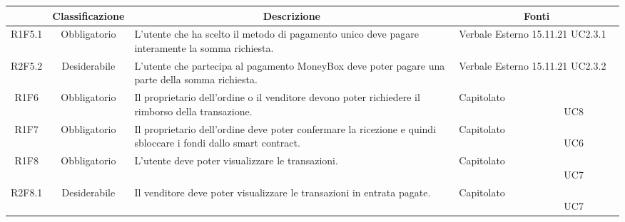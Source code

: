 \begin{table}[H]
    \centering
    \renewcommand{\arraystretch}{1.8}
    \begin{tabular}{c | c | p{6cm} | p{4.1cm}}
        \rowcolor[HTML]{125E28}
        \multicolumn{1}{c}{\color[HTML]{FFFFFF} \textbf{Codice}}          &
        \multicolumn{1}{c}{\color[HTML]{FFFFFF} \textbf{Classificazione}} &
        \multicolumn{1}{c}{\color[HTML]{FFFFFF} \textbf{Descrizione}}     &
        \multicolumn{1}{c}{\color[HTML]{FFFFFF} \textbf{Fonti}}                                                                                                                                                                                     \\
        \hline
        R1F5.1                                                            & Obbligatorio & L'utente che ha scelto il metodo di pagamento unico deve pagare interamente la somma richiesta.                       & Verbale Esterno 15.11.21 UC2.3.1 \\
        R2F5.2                                                            & Desiderabile & L'utente che partecipa al pagamento MoneyBox\glo{} deve poter pagare una parte della somma richiesta.                 & Verbale Esterno 15.11.21 UC2.3.2 \\
        R1F6                                                              & Obbligatorio & Il proprietario dell'ordine o il venditore devono poter richiedere il rimborso della transazione.                     & Capitolato \ \ \ \ \ \ \ \ \ \ \ \ \ \ \ \ \ \ \ \ \ UC8                   \\
        R1F7                                                              & Obbligatorio & Il proprietario dell'ordine deve poter confermare la ricezione e quindi sbloccare i fondi dallo smart contract\glo{}. & Capitolato \ \ \ \ \ \ \ \ \ \ \ \ \ \ \ \ \ \ \ \ \ UC6                   \\
        R1F8                                                              & Obbligatorio & L'utente deve poter visualizzare le transazioni.                                                                      & Capitolato \ \ \ \ \ \ \ \ \ \ \ \ \ \ \ \ \ \ \ \ \ UC7                   \\
        R2F8.1                                                            & Desiderabile & Il venditore deve poter visualizzare le transazioni in entrata pagate.                                                & Capitolato \ \ \ \ \ \ \ \ \ \ \ \ \ \ \ \ \ \ \ \ \ UC7                   \\

\end{tabular}
\end{table}
